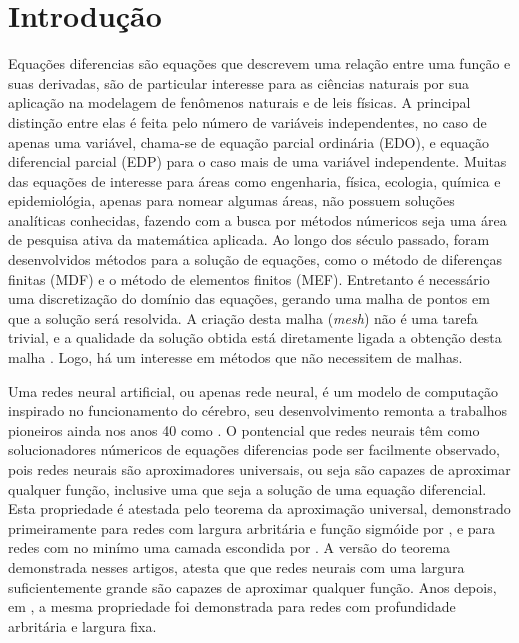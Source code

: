 \chapter{Introdução}
\label{sec-intro}

Equações diferencias são equações que descrevem uma relação entre uma função
e suas derivadas, são de particular interesse para as ciências naturais
por sua aplicação na modelagem de fenômenos naturais e de leis físicas.
A principal distinção entre elas é feita pelo número de variáveis independentes,
no caso de apenas uma variável, chama-se de equação parcial ordinária (EDO),
e equação diferencial parcial (EDP) para o caso mais de uma variável independente.
Muitas das equações de interesse para áreas como engenharia, física, 
ecologia, química e epidemiológia, apenas para nomear algumas áreas, 
não possuem soluções analíticas conhecidas, fazendo com a busca por métodos 
númericos seja uma área de pesquisa ativa da matemática aplicada. 
Ao longo dos século passado, foram desenvolvidos métodos para a solução de 
equações, como o método de diferenças finitas (MDF) e o 
método de elementos finitos (MEF).
Entretanto é necessário uma discretização do domínio das equações, gerando uma 
malha de pontos em que a solução será resolvida.
A criação desta malha (\textit{mesh}) não é uma tarefa trivial, e a qualidade 
da solução obtida está diretamente ligada a obtenção desta malha \cite{raissi-etal:19}.
Logo, há um interesse em métodos que não necessitem de malhas. 

Uma redes neural artificial, ou apenas rede neural, é um modelo de computação 
inspirado no funcionamento do cérebro, seu desenvolvimento remonta a trabalhos
pioneiros ainda nos anos 40 como \cite{mcculloch-pitts:1943-perceptron}.
O pontencial que redes neurais têm como solucionadores númericos de equações
diferencias pode ser facilmente observado, pois redes neurais são aproximadores
universais, ou seja são capazes de aproximar qualquer função, inclusive uma 
que seja a solução de uma equação diferencial.
Esta propriedade é atestada pelo teorema da aproximação universal, 
demonstrado primeiramente para redes com
largura arbritária e função sigmóide por \cite{cybenko:89}, e para redes 
com no minímo uma camada escondida por \cite{hornik:89-aprox-universais}. 
A versão do teorema demonstrada nesses artigos, atesta que
que redes neurais com uma largura suficientemente grande são capazes de aproximar 
qualquer função. Anos depois, em \cite{grippen:03-aprox-universais-profundidade},
a mesma propriedade foi demonstrada para redes com profundidade arbritária 
e largura fixa.

